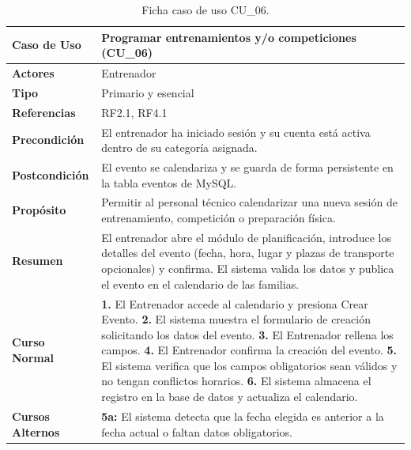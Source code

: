         \begin{table}[htbp]
        \centering
        \footnotesize
        \renewcommand{\arraystretch}{0.95}
        \begin{tabularx}{\textwidth}{|l|X|}
        \hline
        \rowcolor[HTML]{EFEFEF} 
        \textbf{Caso de Uso} & \textbf{Programar entrenamientos y/o competiciones (CU\_06)} \\ \hline
        \textbf{Actores} & Entrenador \\ \hline
        \textbf{Tipo} & Primario y esencial \\ \hline
        \textbf{Referencias} & RF2.1, RF4.1 \\ \hline
        \textbf{Precondición} & El entrenador ha iniciado sesión y su cuenta está activa dentro de su categoría asignada. \\ \hline
        \textbf{Postcondición} & El evento se calendariza y se guarda de forma persistente en la tabla eventos de MySQL. \\ \hline
        \textbf{Propósito} & Permitir al personal técnico calendarizar una nueva sesión de entrenamiento, competición o preparación física. \\ \hline
        \textbf{Resumen} & El entrenador abre el módulo de planificación, introduce los detalles del evento (fecha, hora, lugar y plazas de transporte opcionales) y confirma. El sistema valida los datos y publica el evento en el calendario de las familias. \\ \hline
        \textbf{Curso Normal} & 
        \textbf{1.} El Entrenador accede al calendario y presiona Crear Evento.\newline
        \textbf{2.} El sistema muestra el formulario de creación solicitando los datos del evento.\newline
        \textbf{3.} El Entrenador rellena los campos.\newline
        \textbf{4.} El Entrenador confirma la creación del evento.\newline
        \textbf{5.} El sistema verifica que los campos obligatorios sean válidos y no tengan conflictos horarios.\newline
        \textbf{6.} El sistema almacena el registro en la base de datos y actualiza el calendario. \\ \hline
        \textbf{Cursos Alternos} & 
        \textbf{5a:} El sistema detecta que la fecha elegida es anterior a la fecha actual o faltan datos obligatorios. \\ \hline
        \end{tabularx}
        \caption{Ficha caso de uso CU\_06.}
        \label{tab:cu_06}
        \end{table}

